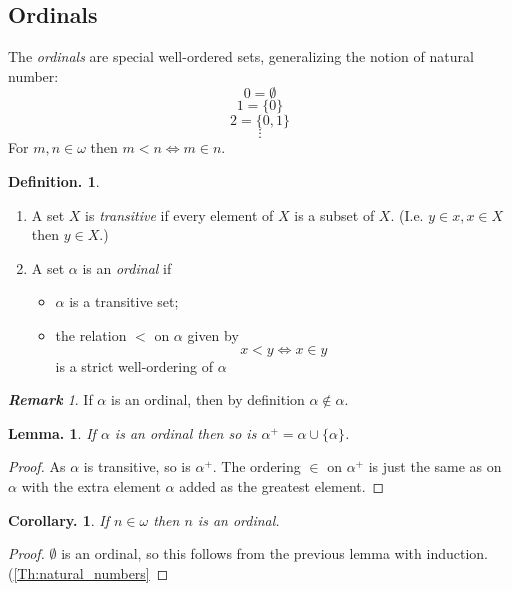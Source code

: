 \documentclass[a4paper,oneside,11pt,DIV=12,parskip=half]{scrartcl}
\theoremstyle{plain}
\newtheorem{lemma}[theorem]{Lemma.}
\newtheorem{corollary}[theorem]{Corollary.}
\theoremstyle{definition}
\newtheorem{definition}[theorem]{Definition.}
\newtheorem{remark, definition}[theorem]{Remark and Definition.}
\newtheorem{lemma, definition}[theorem]{Lemma and Definition.}
\newtheorem{theorem, definition}[theorem]{Theorem and Definition.}
\theoremstyle{remark}
\newtheorem*{remark}{\textbf{Remark}}
\newtheorem*{remark, example}{\textbf{Remark and Exercise}}
\begin{document}
\subsection{Ordinals}

The \emph{ordinals} are special well-ordered sets, generalizing the notion of natural number:
    \[ 0 = \emptyset \]
    \[ 1 = \{0\} \]
    \[ 2 = \{0,1\} \]
    \[ \vdots \]
For $m,n \in \omega$ then $m < n \Leftrightarrow m \in n $.

\begin{definition}
\begin{enumerate}
    \item A set $X$ is \emph{transitive} if every element of $X$ is a subset of $X$. (I.e. $y \in x, x \in X $ then $y \in X$.)
    \item A set $\alpha$ is an \emph{ordinal} if 
    \begin{itemize}
        \item $\alpha$ is a transitive set;
        \item the relation $<$ on $\alpha$ given by
            \[ x < y \Leftrightarrow x \in y \]
        is a strict well-ordering of $\alpha$
    \end{itemize}
    \end{enumerate}
\end{definition}

\begin{remark}
If $\alpha$ is an ordinal, then by definition $\alpha \not \in \alpha$.
\end{remark}

\begin{lemma}
If $\alpha$ is an ordinal then so is $\alpha^+ = \alpha \cup \{ \alpha \}$.
\end{lemma}
\begin{proof}
As $\alpha$ is transitive, so is $\alpha^+$. The ordering $\in$ on $\alpha^+$ is just the same as on $\alpha$ with the extra element $\alpha$ added as the greatest element.
\end{proof}

\begin{corollary}
If $n \in \omega$ then $n$ is an ordinal.
\end{corollary}

\begin{proof}
$\emptyset$ is an ordinal, so this follows from the previous lemma with induction. (\ref{Th:natural_numbers}
\end{proof}
\end{document}

